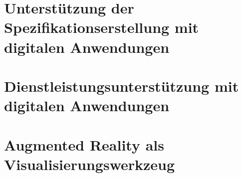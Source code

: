 \section{Unterstützung der Spezifikationserstellung mit digitalen Anwendungen}



\section{Dienstleistungsunterstützung mit digitalen Anwendungen}

\section{Augmented Reality als Visualisierungswerkzeug}